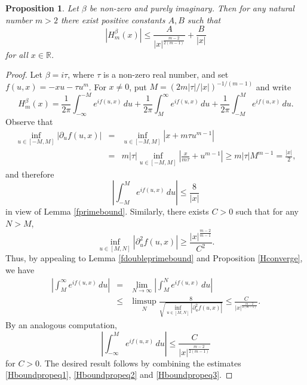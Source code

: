 \documentclass{article}
\theoremstyle{theorem}
\newtheorem{proposition}[theorem]{Proposition}
\theoremstyle{remark}
\begin{document}
\begin{proposition}\label{Hassymptoticprop}
Let $\beta$ be non-zero and purely imaginary. Then for any natural number $m>2$ there exist positive constants $A,B$ such that
\begin{equation}\label{Hassymptotic}
|H_m^{\beta}(x)|\leq\frac{A}{|x|^{\frac{m-2}{2(m-1)}}}+\frac{B}{|x|}
\end{equation}
for all $x\in\mathbb{R}$.
\end{proposition}
\begin{proof}
Let $\beta=i\tau$, where $\tau$ is a non-zero real number, and set \break$f(u,x)=-xu-\tau u^m$. For $x\neq 0$, put $M=(2m|\tau|/|x|)^{-1/(m-1)}$ and write
\begin{equation}\label{Hboundpropeq1}
H_m^{\beta}(x)=\frac{1}{2\pi}\int_{-\infty}^{-M}e^{if(u,x)}\,du+\frac{1}{2\pi}\int_{M}^{\infty}e^{if(u,x)}\,du+\frac{1}{2\pi}\int_{-M}^{M}e^{if(u,x)}\,du.
\end{equation}
Observe that
\begin{eqnarray*}
\inf_{u\in[-M,M]}|\partial_uf(u,x)|&=&\inf_{u\in[-M,M]}|x+m\tau u^{m-1}|\\
&=& m|\tau|\inf_{u\in[-M,M]}\left|\frac{x}{m\tau}+u^{m-1}\right|\geq m|\tau| M^{m-1}=\frac{|x|}{2},
\end{eqnarray*}
and therefore
\begin{equation}\label{Hboundpropeq2}
\left|\int_{-M}^{M}e^{if(u,x)}\,du\right|\leq\frac{8}{|x|} 
\end{equation}
in view of Lemma \ref{fprimebound}. Similarly, there exists $C>0$ such that for any $N>M$,
\begin{equation*}
\inf_{u\in[M,N]}|\partial_u^2f(u,x)|\geq \frac{|x|^{\frac{m-2}{m-1}}}{C^2}.
\end{equation*}
Thus, by appealing to Lemma \ref{fdoubleprimebound} and Proposition \ref{Hconverge}, we have
\begin{eqnarray*}
\left|\int_{M}^{\infty}e^{if(u,x)}\,du\right|&=&\lim_{N\rightarrow\infty}\left|\int_M^N e^{if(u,x)}\,du\right|\\
&\leq&\limsup_N \frac{8}{\sqrt{\inf_{u\in[M,N]}|\partial_u^2f(u,x)|}}\leq\frac{C}{|x|^{\frac{m-2}{2(m-1)}}}.
\end{eqnarray*}
By an analogous computation,
\begin{equation}\label{Hboundpropeq3}
\left|\int_{-\infty}^{M}e^{if(u,x)}\,du\right|\leq \frac{C}{|x|^{\frac{m-2}{2(m-1)}}}
\end{equation}
for $C>0$. The desired result follows by combining the estimates \eqref{Hboundpropeq1}, \eqref{Hboundpropeq2} and \eqref{Hboundpropeq3}.
\end{proof}
\end{document}
